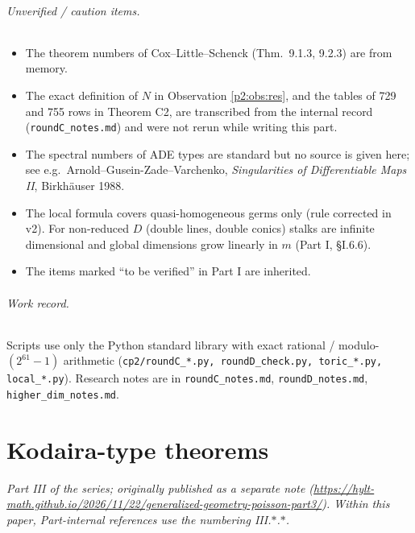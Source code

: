 \paragraph{Unverified / caution items.}
\begin{itemize}
\item The theorem numbers of Cox--Little--Schenck (Thm.\ 9.1.3, 9.2.3) are from memory.\tQ
\item The exact definition of $N$ in Observation \ref{p2:obs:res}, and the tables of 729 and 755 rows in Theorem C2, are transcribed from the internal record (\texttt{roundC\_notes.md}) and were not rerun while writing this part.\tQ
\item The spectral numbers of ADE types are standard but no source is given here; see e.g.\ Arnold--Gusein-Zade--Varchenko, \emph{Singularities of Differentiable Maps II}, Birkh\"auser 1988.\tQ
\item The local formula covers quasi-homogeneous germs only (rule corrected in v2). For non-reduced $D$ (double lines, double conics) stalks are infinite dimensional and global dimensions grow linearly in $m$ (Part I, \S I.6.6).
\item The items marked ``to be verified'' in Part I are inherited.
\end{itemize}

\paragraph{Work record.} Scripts use only the Python standard library with exact rational / modulo-$(2^{61}-1)$ arithmetic (\texttt{cp2/roundC\_*.py, roundD\_check.py, toric\_*.py, local\_*.py}). Research notes are in \texttt{roundC\_notes.md}, \texttt{roundD\_notes.md}, \texttt{higher\_dim\_notes.md}.




\clearpage
\part{Kodaira-type theorems}
\setcounter{section}{0}
\noindent\textit{Part III of the series; originally published as a separate note (\url{https://hylt-math.github.io/2026/11/22/generalized-geometry-poisson-part3/}). Within this paper, Part-internal references use the numbering III.$\ast$.$\ast$.}\par
